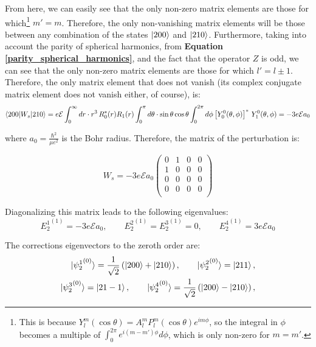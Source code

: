 From here, we can easily see that the only non-zero matrix elements are those for which\footnote{This is because $Y_l^m(\cos \theta) = A_l^mP_l^m(\cos \theta)e^{im\phi}$, so the integral in $\phi$ becomes a multiple of $\int_0^{2\pi}e^{i(m-m')\phi}d\phi$, which is only non-zero for $m=m'$.} $m' = m$. Therefore, the only non-vanishing matrix elements will be those between any combination of the states $\ket{200}$ and $\ket{210}$. Furthermore, taking into account the parity of spherical harmonics, from \textbf{Equation \ref{parity_spherical_harmonics}}, and the fact that the operator $Z$ is odd, we can see that the only non-zero matrix elements are those for which $l' = l\pm 1$. Therefore, the only matrix element that does not vanish (its complex conjugate matrix element does not vanish either, of course), is:
\begin{equation}
    \begin{split}
        \braket{200|W_s|210} &= e\mathcal{E} \int_{0}^{\infty}dr\cdot r^3\, R_0^*(r)R_1(r)\int_{0}^{\pi}d\theta\cdot \sin\theta\cos\theta\int_{0}^{2\pi}d\phi \left[Y_0^0(\theta, \phi)\right]^*\, Y_1^0(\theta, \phi) = -3e\mathcal{E}a_0\\
    \end{split}
\end{equation}

where $a_0 = \frac{\hbar^2}{\mu e^2}$ is the Bohr radius. Therefore, the matrix of the perturbation is:

\begin{equation}
    W_s = -3e\mathcal{E}a_0\begin{pmatrix}
        0 & 1 & 0 & 0 \\
        1 & 0 & 0 & 0 \\
        0 & 0 & 0 & 0 \\
        0 & 0 & 0 & 0 \\
    \end{pmatrix}
\end{equation}

Diagonalizing this matrix leads to the following eigenvalues:
\begin{equation}
    {E_2^1}^{(1)} = -3e\mathcal{E}a_0,\qquad {E_2^2}^{(1)} = {E_2^3}^{(1)} = 0, \qquad {E_2^4}^{(1)} = 3e\mathcal{E}a_0
\end{equation}

The corrections eigenvectors to the zeroth order are:
\begin{equation}
    \begin{split}
        \ket{{\psi_2^1}^{(0)}} = \frac{1}{\sqrt{2}} \left(\ket{200} + \ket{210}\right), \qquad \ket{{\psi_2^2}^{(0)}} = \ket{211},\\
        \ket{{\psi_2^3}^{(0)}} = \ket{21-1}, \qquad \ket{{\psi_2^4}^{(0)}} = \frac{1}{\sqrt{2}} \left(\ket{200} - \ket{210}\right),\\
    \end{split}
\end{equation}

